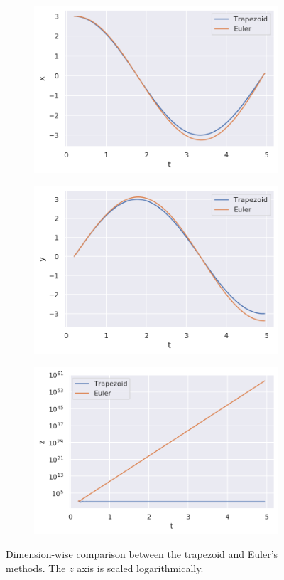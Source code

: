 \documentclass[12pt]{article}
\begin{document}
\begin{figure}[h]
\centering
\begin{subfigure}{.5\linewidth}
  \centering
  \includegraphics[width=\linewidth]{x.png}
\end{subfigure}%
\begin{subfigure}{.5\linewidth}
  \centering
  \includegraphics[width=\linewidth]{y.png}
\end{subfigure}
\begin{subfigure}{\linewidth}
  \centering
  \includegraphics[width=.5\linewidth]{z.png}
\end{subfigure}
\caption{Dimension-wise comparison between the trapezoid and Euler's methods. The $z$ axis is scaled logarithmically.}
\end{figure}
\end{document}
